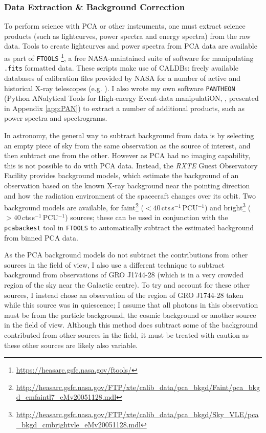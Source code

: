 \subsubsection{Data Extraction \& Background Correction}

\par To perform science with PCA or other instruments, one must extract science products (such as lightcurves, power spectra and energy spectra) from the raw data.  Tools to create lightcurves and power spectra from PCA data are available as part of \texttt{FTOOLS} \footnote{\url{https://heasarc.gsfc.nasa.gov/ftools/}}, a free NASA-maintained suite of software for manipulating \texttt{.fits} formatted data.  These scripts make use of CALDBs: freely available databases of calibration files provided by NASA for a number of active and historical X-ray telescopes (e.g. \citealp{Graessle_ChaCALDB}).  I also wrote my own software \texttt{PANTHEON} (Python ANalytical Tools for High-energy Event-data manipulatiON, \citealp{Court_PANTHEON}, presented in Appendix \ref{app:PAN}) to extract a number of additional products, such as power spectra and spectrograms.
\par In astronomy, the general way to subtract background from data is by selecting an empty piece of sky from the same observation as the source of interest, and then subtract one from the other.  However as PCA had no imaging capability, this is not possible to do with PCA data.  Instead, the \textit{RXTE} Guest Observatory Facility provides background models, which estimate the background of an observation based on the known X-ray background near the pointing direction and how the radiation environment of the spacecraft changes over its orbit.  Two background models are available, for faint\footnote{\url{http://heasarc.gsfc.nasa.gov/FTP/xte/calib_data/pca_bkgd/Faint/pca_bkgd_cmfaintl7_eMv20051128.mdl}} ($<40$\,cts\,s$^{-1}$\,PCU$^{-1}$) and bright\footnote{\url{http://heasarc.gsfc.nasa.gov/FTP/xte/calib_data/pca_bkgd/Sky_VLE/pca_bkgd_cmbrightvle_eMv20051128.mdl}} ($>40$\,cts\,s$^{-1}$\,PCU$^{-1}$) sources; these can be used in conjunction with the \texttt{pcabackest} tool in \texttt{FTOOLS} to automatically subtract the estimated background from binned PCA data.
\par As the PCA background models do not subtract the contributions from other sources in the field of view, I also use a different technique to subtract background from observations of GRO J1744-28 (which is in a very crowded region of the sky near the Galactic centre).  To try and account for these other sources, I instead chose an observation of the region of GRO J1744-28 taken while this source was in quiescence; I assume that all photons in this observation must be from the particle background, the cosmic background or another source in the field of view.  Although this method does subtract some of the background contributed from other sources in the field, it must be treated with caution as these other sources are likely also variable.
